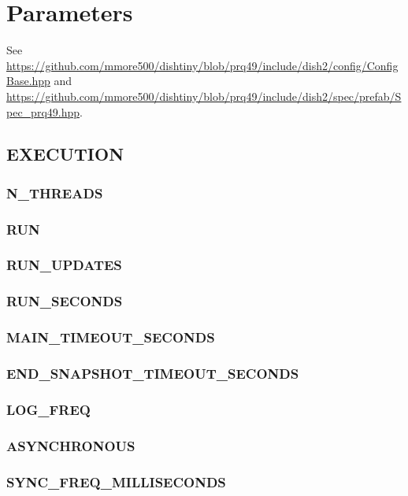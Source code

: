 \section{Parameters}

See \url{https://github.com/mmore500/dishtiny/blob/prq49/include/dish2/config/ConfigBase.hpp} and \url{https://github.com/mmore500/dishtiny/blob/prq49/include/dish2/spec/prefab/Spec\_prq49.hpp}.

\subsection{EXECUTION}


\subsubsection{N\_THREADS}

\subsubsection{RUN}

\subsubsection{RUN\_UPDATES}

\subsubsection{RUN\_SECONDS}

\subsubsection{MAIN\_TIMEOUT\_SECONDS}

\subsubsection{END\_SNAPSHOT\_TIMEOUT\_SECONDS}

\subsubsection{LOG\_FREQ}

\subsubsection{ASYNCHRONOUS}

\subsubsection{SYNC\_FREQ\_MILLISECONDS}

